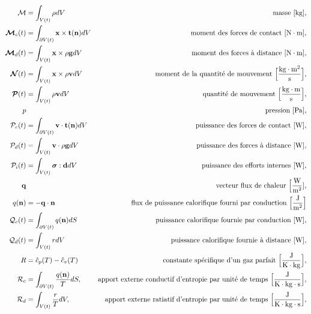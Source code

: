 \begin{align*}
      \mathcal{M} & = \int_{V(t)} \rho dV  & \textrm{masse [\si{kg}],}\\
      \bs{\mathcal{M}}_c (t) &= \int_{\partial V(t)} \vb{x} \times \vb{t}(\vb{n}) dV & \textrm{moment des forces de contact } [\si{N \cdot m}],\\
      \bs{\mathcal{M}}_d (t) &= \int_{V(t)} \vb{x} \times \rho \vb{g} dV & \textrm{moment des forces à distance } [\si{N \cdot m}],\\
      \bs{\mathcal{N}}(t) &= \int_{V(t)} \vb{x} \times \rho \vb{v} dV & \textrm{moment de la quantité de mouvement } \Big[\si{\frac{kg \cdot  m^2}{s}}\Big],\\
      \bs{\mathcal{P}}(t) &= \int_{V(t)} \rho \vb{v} dV & \textrm{quantité de mouvement } \Big[\si{\frac{kg \cdot m}{s}}\Big],\\
      p & & \textrm{pression } [\si{Pa}],\\
      \mathcal{P}_c(t) &= \int_{\partial V(t)} \vb{v} \cdot \vb{t}(\vb{n}) dV & \textrm{puissance des forces de contact } [\si{W}], \\
      \mathcal{P}_d(t) &= \int_{V(t)} \vb{v} \cdot \rho \vb{g} dV & \textrm{puissance des forces à distance } [\si{W}], \\
      \mathcal{P}_i(t) &= \int_{V(t)} \bs{\sigma} : \vb{d} dV & \textrm{puissance des efforts internes } [\si{W}],\\
      \vb{q} & & \textrm{vecteur flux de chaleur } \Big[\si{\frac{W}{m^2}}], \\
      q(\vb{n}) &= - \vb{q} \cdot \vb{n} & \textrm{flux de puissance calorifique fourni par conduction } \Big[\si{\frac{J}{m^2}}\Big]\\
      \mathcal{Q}_c(t) &= \int_{\partial V(t)} q(\vb{n}) dS & \textrm{puissance calorifique fournie par conduction } [\si{W}], \\
      \mathcal{Q}_d(t) &= \int_{V(t)} r dV & \textrm{puissance calorifique fournie à distance } [\si{W}], \\
      R &= \hat{c}_p(T) - \hat{c}_v(T) & \textrm{constante spécifique d'un gaz parfait } \Big[\si{\frac{J}{K \cdot kg}}\Big],\\
      \mathcal{R}_c &= \int_{\partial V(t)} \frac{q(\vb{n})}{T}dS, & \textrm{apport externe conductif d'entropie par unité de temps }\Big[\si{\frac{J}{K \cdot kg \cdot \s}}\Big],\\
      \mathcal{R}_d &= \int_{V(t)} \frac{r}{T} dV, & \textrm{apport externe ratiatif d'entropie par unité de temps }\Big[\si{\frac{J}{K \cdot kg \cdot s}}\Big],\\

\end{align*}
